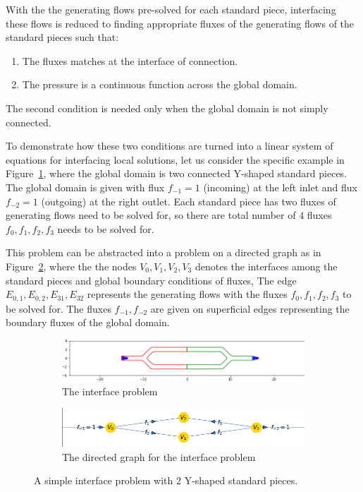 \documentclass[10pt,twocolumn,letterpaper]{article}
\begin{document}
With the the generating flows pre-solved for each standard piece, 
interfacing these flows is reduced to finding 
appropriate fluxes of the generating flows of the standard pieces such that:
\begin{enumerate}
  \item The fluxes matches at the interface of connection\label{cond:flux-match}.
  \item The pressure is a continuous function across the global  domain.\label{cond:pressure}
\end{enumerate}
The second condition is needed only when the global domain is not simply connected. 

To demonstrate how these two conditions are turned into 
a linear system of equations for interfacing local solutions, 
let us consider the specific example in Figure~\ref{fig:interface_problem_0}, where the global domain 
is two connected Y-shaped standard pieces. 
The global domain is given with flux $f_{-1} = 1$ (incoming) at the left inlet 
and flux $f_{-2}=1$ (outgoing) at the right outlet. 
Each standard piece has two fluxes of generating flows need to be solved for, 
so there are total number of $4$ fluxes $f_0,f_1,f_2,f_3$ needs to be solved for. 

This problem can be abstracted into a problem 
on a directed graph as in Figure~\ref{fig:interface_problem_1},
where the the nodes $V_0,V_1,V_2,V_3$ denotes the interfaces among the standard pieces 
and global boundary conditions of fluxes, 
The edge $E_{0,1},E_{0,2},E_{31},E_{32}$ represents the generating flows 
with the fluxes $f_0,f_1,f_2,f_3$ to be solved for. 
The fluxes $f_{-1},f_{-2}$ are given on superficial edges representing the boundary fluxes of the global domain.

\begin{figure}[!ht]
  \centering
  \begin{subfigure}[b]{0.45\textwidth}
    \centering
    \includegraphics[width=\textwidth]{pic/simple-interface-problem.png}
    \caption{The interface problem}\label{fig:interface_problem_0}
  \end{subfigure}
  \begin{subfigure}[b]{0.45\textwidth}
    \centering
    \includegraphics[width=\textwidth]{pic/simple-interface-problem-network.png}
    \caption{The directed graph for the interface problem}\label{fig:interface_problem_1}
  \end{subfigure}
  \caption{A simple interface problem with 2 Y-shaped standard pieces.}\label{fig:simple-interface-problem}
\end{figure}
\end{document}
